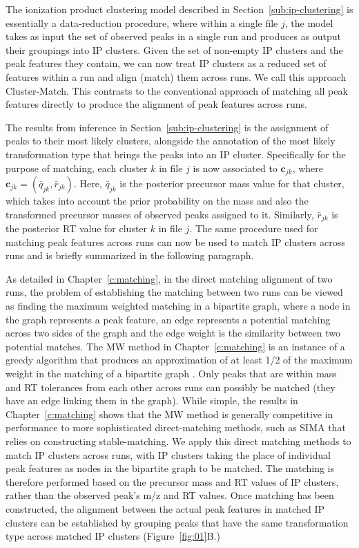 The ionization product clustering model described in Section~\ref{sub:ip-clustering} is essentially a data-reduction procedure, where within a single file $j$, the model takes as input the set of observed peaks in a single run and produces as output their groupings into IP clusters. Given the set of non-empty IP clusters and the peak features they contain, we can now treat IP clusters as a reduced set of features within a run and align (match) them across runs. We call this approach Cluster-Match. This contrasts to the conventional approach of matching all peak features directly to produce the alignment of peak features across runs. 

The results from inference in Section~\ref{sub:ip-clustering} is the assignment of peaks to their most likely clusters, alongside the annotation of the most likely transformation type that brings the peaks into an IP cluster. Specifically for the purpose of matching, each cluster $k$ in file $j$ is now associated to $\boldsymbol{c}_{jk}$, where $\boldsymbol{c}_{jk}=({\bar{q}}_{jk}, {\bar{r}}_{jk})$. Here, ${\bar{q}}_{jk}$ is the posterior precursor mass value for that cluster, which takes into account the prior probability on the mass and also the transformed precursor masses of observed peaks assigned to it. Similarly, ${\bar{r}}_{jk}$ is the posterior RT value for cluster $k$ in file $j$. The same procedure used for matching peak features across runs can now be used to match IP clusters across runs and is briefly summarized in the following paragraph.

As detailed in Chapter~\ref{c:matching}, in the direct matching alignment of two runs, the problem of establishing the matching between two runs can be viewed as finding the maximum weighted matching in a bipartite graph, where a node in the graph represents a peak feature, an edge represents a potential matching across two sides of the graph and the edge weight is the similarity between two potential matches. The MW method  in Chapter~\ref{c:matching} is an instance of a greedy algorithm that produces an approximation of at least 1/2 of the maximum weight in the matching of a bipartite graph \cite{Maximum2011}. Only peaks that are within mass and RT tolerances from each other across runs can possibly be matched (they have an edge linking them in the graph). While simple, the results in Chapter~\ref{c:matching} shows that the MW method is generally competitive in performance to more sophisticated direct-matching methods, such as SIMA that relies on constructing stable-matching. We apply this direct matching methods to match IP clusters across runs, with IP clusters taking the place of individual peak features as nodes in the bipartite graph to be matched. The matching is therefore performed based on the precursor mass and RT values of IP clusters, rather than the observed peak's m/z and RT values. Once matching has been constructed, the alignment between the actual peak features in matched IP clusters can be established by grouping peaks that have the same transformation type across matched IP clusters (Figure~\ref{fig:01}B.)

